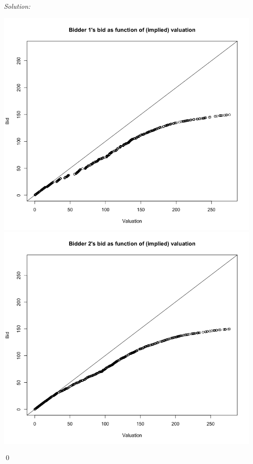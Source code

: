 \documentclass[12pt]{article}
\newenvironment{sol}
    {\emph{Solution:}
    }
    {
    \qed
    }
\begin{document}
\begin{sol}
\begin{center}
        \includegraphics[scale=0.25]{Bid_1.png} \includegraphics[scale=0.25]{Bid_2.png}\\

\end{center}
\end{sol}
\end{document}
